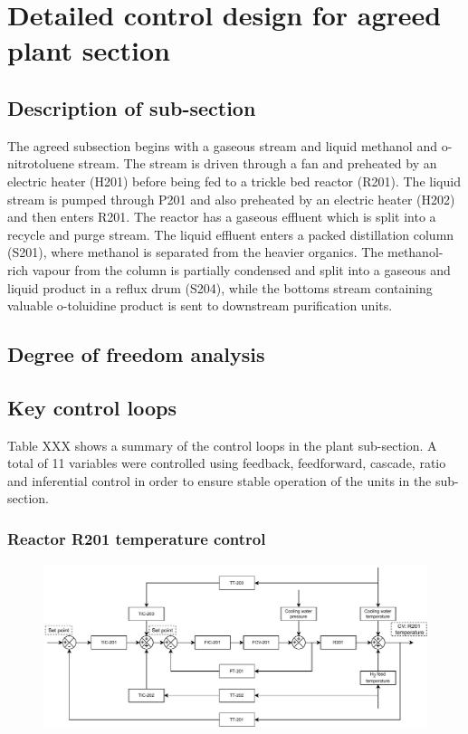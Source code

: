 \section{Detailed control design for agreed plant section}
\label{sec:subsec}

\subsection{Description of sub-section}
The agreed subsection begins with a gaseous  stream and liquid methanol and o-nitrotoluene stream. The  stream is driven through a fan and preheated by an electric heater (H201) before being fed to a trickle bed reactor (R201). The liquid stream is pumped through P201 and also preheated by an electric heater (H202) and then enters R201. The reactor has a gaseous effluent which is split into a recycle and purge stream. The liquid effluent enters a packed distillation column (S201), where methanol is separated from the heavier organics. The methanol-rich vapour from the column is partially condensed and split into a gaseous and liquid product in a reflux drum (S204), while the bottoms stream containing valuable o-toluidine product is sent to downstream purification units.

\subsection{Degree of freedom analysis}

\subsection{Key control loops}
Table XXX shows a summary of the control loops in the plant sub-section. A total of 11 variables were controlled using feedback, feedforward, cascade, ratio and inferential control in order to ensure stable operation of the units in the sub-section.

\subsubsection{Reactor R201 temperature control}
\begin{figure}[H]
    \centering
    \includegraphics[width=\linewidth]{chapters/4-operation-control/4-Figures/R201-TC.pdf}
    \caption{}
    \label{fig:R201-TC}
\end{figure}

